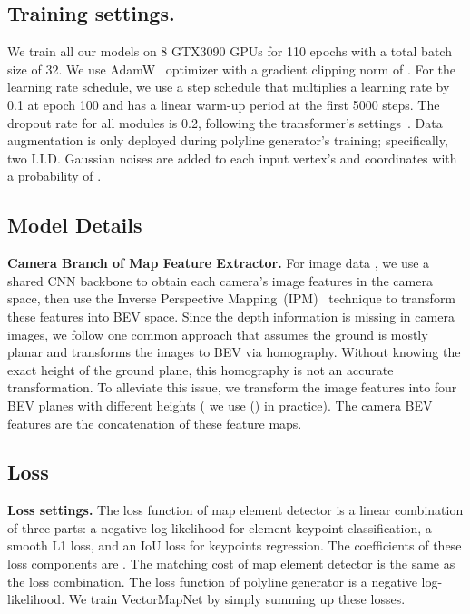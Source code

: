 \documentclass{article}
\theoremstyle{plain}
\theoremstyle{definition}
\theoremstyle{remark}
\begin{document}
\subsection{Training settings.}
We train all our models on 8 GTX3090 GPUs for 110 epochs with a total batch size of 32.
We use AdamW~\citep{loshchilov2018fixing} optimizer with a gradient clipping norm of . For the learning rate schedule, we use a step schedule that multiplies a learning rate by 0.1 at epoch 100 and has a linear warm-up period at the first 5000 steps. The dropout rate for all modules is 0.2, following the transformer's settings~\citep{vaswani2017attention}. 
Data augmentation is only deployed during polyline generator's training; specifically, two I.I.D. Gaussian noises are added to each input vertex's  and  coordinates with a probability of .

\subsection{Model Details}
\label{model_details}
\noindent\textbf{Camera Branch of Map Feature Extractor.}
For image data , we use a shared CNN backbone to obtain each camera's image features in the camera space, then use the Inverse Perspective Mapping~(IPM)~\citep{mallot1991inverse} technique to transform these features into BEV space. Since the depth information is missing in camera images, we follow one common approach that assumes the ground is mostly planar and transforms the images to BEV via homography. 
Without knowing the exact height of the ground plane, this homography is not an accurate transformation. 
To alleviate this issue, we transform the image features into four BEV planes with different heights ( we use () in practice). The camera BEV features  are the concatenation of these feature maps.

\subsection{Loss}
\label{subsec:loss}
\noindent\textbf{Loss settings.} The loss function of map element detector is a linear combination of three parts: a negative log-likelihood for element keypoint classification, a smooth L1 loss, and an IoU loss for keypoints regression. The coefficients of these loss components are . The matching cost of map element detector is the same as the loss combination.
The loss function of polyline generator is a negative log-likelihood. 
We train VectorMapNet by simply summing up these losses.
\end{document}

